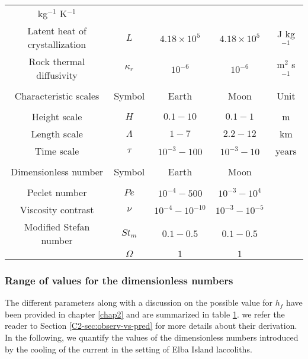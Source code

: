 \begin{table}[h!]
\begin{center}
{\begin{tabular}{c|c|c|c|c}
                                                                      kg$^{-1}$ K$^{-1}$\\
        Latent       heat       of      crystallization&       $L$       &
                                                                           $4.18\times10^5$&$4.18\times10^5$& J kg$^{-1}$\\
        Rock  thermal  diffusivity  &$\kappa_r$& $10^{-6}$  &$10^{-6}$  &
                                                                          m$^{2}$
                                                                          s$^{-1}$\\
                  &&&&\\
        \hline
        Characteristic scales & Symbol & Earth & Moon&Unit\\
        \hline
                  &&&&\\
        Height scale & $H$& $0.1-10$ &$0.1-1$ &m \\
        Length scale & $\Lambda$ & $1-7$&$2.2-12$& km \\
        Time scale & $\tau$ & $10^{-3}-100$&$10^{-3}-10$& years \\
                  &&&&\\
        \hline
        Dimensionless number & Symbol & Earth & Moon&\\
        \hline
                  &&&&\\
        Peclet number &$Pe$& $10^{-4}-500$&$10^{-3}-10^4$ &\\
        Viscosity contrast & $\nu$ & $10^{-4}-10^{-10}$& $10^{-3}-10^{-5}$&\\
        Modified Stefan number & $St_m$ & $0.1-0.5$ &  $0.1-0.5$ &\\
                  &$\Omega$ & $1$ & $1$&
                                         \label{C4-tab2}
      \end{tabular} 
    }
  \end{center}
  \label{C4-tab}
\end{table}

\subsubsection*{Range of values for the dimensionless numbers}
\label{C4-sec:range-valu-dimens}
 
The different parameters along with a discussion on the possible value
for $h_f$ have been provided in chapter \ref{chap2} and are summarized
in   table   \ref{C4-tab}.    we   refer   the   reader   to   Section
\ref{C2-sec:observ-vs-pred} for  more details about  their derivation.
In the following, we quantify  the values of the dimensionless numbers
introduced by the cooling of the current in the setting of Elba Island
laccoliths.

